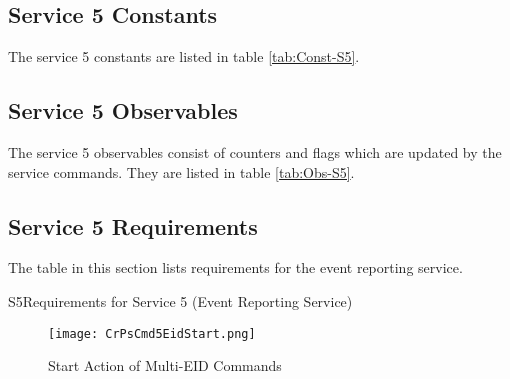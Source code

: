 \documentclass{pnp_article}
\begin{document}
\newpage
{}
\newpage
{}
\newpage
{}
\newpage
{}


\newpage
\subsection{Service 5 Constants}\label{sec:serv5Const}
The service 5 constants are listed in table \ref{tab:Const-S5}. 



\subsection{Service 5 Observables}\label{sec:serv5Obs}
The service 5 observables consist of counters and flags which are updated by the service commands. They are listed in table \ref{tab:Obs-S5}.



\newpage
\subsection{Service 5 Requirements}
The table in this section lists requirements for the event reporting service.

\begin{crReq}{S5}{Requirements for Service 5 (Event Reporting Service)}
\end{crReq}

\begin{figure}[H]
 \centering
 \texttt{[image: CrPsCmd5EidStart.png]}
 \caption{Start Action of Multi-EID Commands}
 \label{fig:Cmd5EidStart}
\end{figure}
\end{document}
